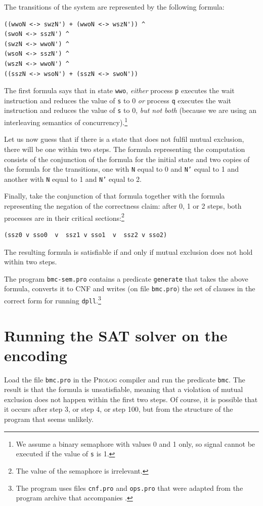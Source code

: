 \documentclass[11pt]{report}
\newcommand*{\p}[1]{\textup{\texttt{#1}}}
\newcommand*{\pl}{\textsc{Prolog}}
\begin{document}
The transitions of the system are represented by the following formula:
\begin{verbatim}
((wwoN <-> swzN') + (wwoN <-> wszN')) ^
(swoN <-> sszN') ^
(swzN <-> wwoN') ^
(wsoN <-> sszN') ^
(wszN <-> wwoN') ^
((sszN <-> wsoN') + (sszN <-> swoN'))
\end{verbatim}

The first formula says that in state \p{wwo}, \emph{either} process
\p{p} executes the wait instruction and reduces the value of \p{s} to 0
\emph{or} process \p{q} executes the wait instruction and reduces the
value of \p{s} to 0, \emph{but not both} (because we are using an
interleaving semantics of concurrency).\footnote{We assume a binary
semaphore with values 0 and 1 only, so signal cannot be executed if
the value of \p{s} is 1.}

Let us now guess that if there is a state that does not fulfil mutual
exclusion, there will be one within two steps. The formula representing
the computation consists of the conjunction of the formula for the
initial state and two copies of the formula for the transitions, one
with \p{N} equal to 0 and \p{N'} equal to 1 and another with \p{N} equal
to 1 and \p{N'} equal to 2.

Finally, take the conjunction of that formula together with the formula
representing the negation of the correctness claim: after 0, 1 or 2
steps, both processes are in their critical sections:\footnote{The value
of the semaphore is irrelevant.}

\begin{verbatim}
(ssz0 v sso0  v  ssz1 v sso1  v  ssz2 v sso2)
\end{verbatim}

The resulting formula is satisfiable if and only if mutual exclusion
does not hold within two steps.

The program \p{bmc-sem.pro} contains a predicate \p{generate} that takes
the above formula, converts it to CNF and writes (on file \p{bmc.pro})
the set of clauses in the correct form for running
\p{dpll}.\footnote{The program uses files \p{cnf.pro} and \p{ops.pro}
that were adapted from the program archive that accompanies
\cite{mlcs}.}

\section{Running the SAT solver on the encoding}

Load the file \p{bmc.pro} in the \pl{} compiler and run the predicate
\p{bmc}. The result is that the formula is unsatisfiable, meaning that a
violation of mutual exclusion does not happen within the first two
steps. Of course, it is possible that it occurs after step 3, or step 4,
or step 100, but from the structure of the program that seems unlikely.
\end{document}
